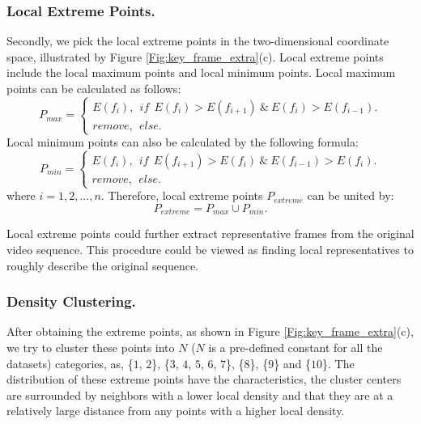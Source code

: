 \documentclass[5p]{elsarticle}
\begin{document}
\subsubsection{Local Extreme Points.}
Secondly, we pick the local extreme points in the two-dimensional coordinate space, illustrated by Figure \ref{Fig:key_frame_extra}(c).
Local extreme points include the local maximum points and local minimum points.
Local maximum points can be calculated as follows:
\begin{equation}
\label{Equ:loc_max}
P_{max} =
\begin{cases}
E(f_i), ~~if~~E(f_i)> E(f_{i+1})~\&~E(f_i)> E(f_{i-1}). \\
remove, ~~else.
\end{cases}
\end{equation}
Local minimum points can also be calculated by the following formula:
\begin{equation}
\label{Equ:loc_min}
P_{min} =
\begin{cases}
E(f_i), ~~if~~E(f_{i+1})> E(f_i)~\&~E(f_{i-1})> E(f_i). \\
remove, ~~else.
\end{cases}
\end{equation}
where $i= 1, 2, ..., n$.
Therefore, local extreme points $P_\mathit{extreme}$ can be united by:
\begin{equation}
\label{Equ:extreme}
P_\mathit{extreme} = P_\mathit{max} \cup P_\mathit{min}.
\end{equation}

Local extreme points could further extract representative frames from the original video sequence.
This procedure could be viewed as finding local representatives to roughly describe the original sequence.

\subsubsection{Density Clustering.}
After obtaining the extreme points, as shown in Figure \ref{Fig:key_frame_extra}(c), we try to cluster these points into $N$ ($N$ is a pre-defined constant for all the datasets) categories, as, \{$1$, $2$\}, \{$3$, $4$, $5$, $6$, $7$\}, \{$8$\}, \{$9$\} and \{$10$\}.
The distribution of these extreme points have the characteristics, the cluster centers are surrounded by neighbors with a lower local density and that they are at a relatively large distance from any points with a higher local density.
\end{document}
